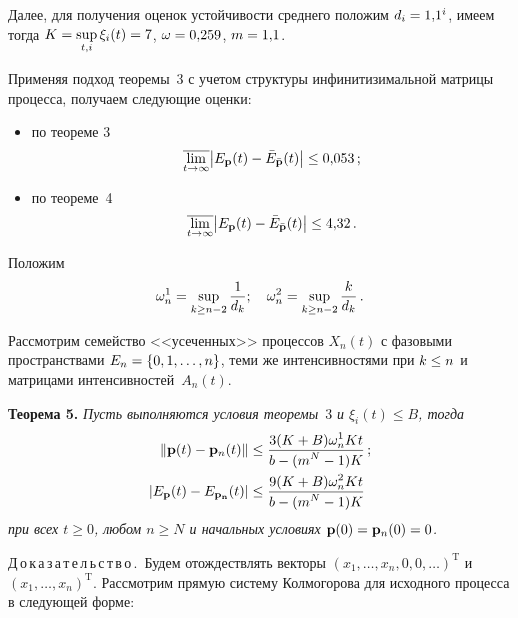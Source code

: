 \begin{multicols}{2}
Далее, для получения оценок устойчивости среднего положим $d_i\hm=1{,}1^i$, 
имеем тогда  $K\hm=\sup\limits_{t,i}\xi_i(t) \hm= 7$,  $\omega\hm=0{,}259$, $m\hm=1{,}1$.

Применяя подход теоремы~3 с учетом структуры инфинитизимальной матрицы процесса, 
получаем следующие оценки:
\begin{itemize}
\item по теореме 3
\begin{equation*}
\overline{\lim\limits_{t \to \infty}}  {\left| E_{\bf p}(t)-\bar{E}_{\bar{\bf p}}(t)\right|} \le 0{,}053\,;
\end{equation*}


\item
по теореме~4
\begin{equation*}
\overline{\lim\limits_{t \to \infty}} {\left| E_{\bf p}(t)-\bar{E}_{\bar{\bf p}}(t)\right|} \le 4{,}32\,.
\end{equation*}

\end{itemize}


Положим
\begin{equation*}
\omega_n^1=\sup\limits_{k \ge n-2}\displaystyle\frac{\displaystyle 1\mathstrut}{\displaystyle d_k\mathstrut}; \quad \omega_n^2=\sup\limits_{k \ge n-2}\displaystyle\frac{\displaystyle k\mathstrut}{\displaystyle d_k\mathstrut}\,.
\end{equation*}

Рассмотрим семейство <<усеченных>> процессов $X_n(t)$ с
фазовыми пространствами $E_n \hm= \{0,1,\dots,n\}$, теми же
интенсивностями при  $k \hm\le n$ и матрицами интенсивностей~$A_n(t)$.

\medskip

\noindent
\textbf{Теорема 5.} \textit{Пусть выполняются условия теоремы}~3 \textit{и $\xi_i(t) \le B$, 
тогда
\begin{align*}
\|{\bf p} (t) - {\bf p}_n(t)\| &\le  \displaystyle\frac{\displaystyle 3(K+B)\omega_n^1 Kt \mathstrut}{\displaystyle b-(m^N-1)K\mathstrut}\,;
\\
\left|E_{\bf p}(t)- {E}_{\bf p_n}(t)\right| &\le \displaystyle\frac{\displaystyle  9(K+B)\omega_n^2 K t\mathstrut}{\displaystyle b-(m^N-1)K\mathstrut}
\end{align*}
при всех $t \ge 0$, любом $n \ge N$ и  начальных условиях ${\bf p}(0)={\bf p}_n(0)=0$.
}

\medskip

\noindent
Д\,о\,к\,а\,з\,а\,т\,е\,л\,ь\,с\,т\,в\,о\,.\ Будем отождествлять векторы
$\left(x_1,\dots,x_n,0,0,\dots\right)^{\mathrm{T}}$ и $\left(x_1,\dots,x_n
\right)^{\mathrm{T}}$.  Рас\-смот\-рим прямую систему Колмогорова   для
исходного процесса  в следующей форме:


\end{multicols}
